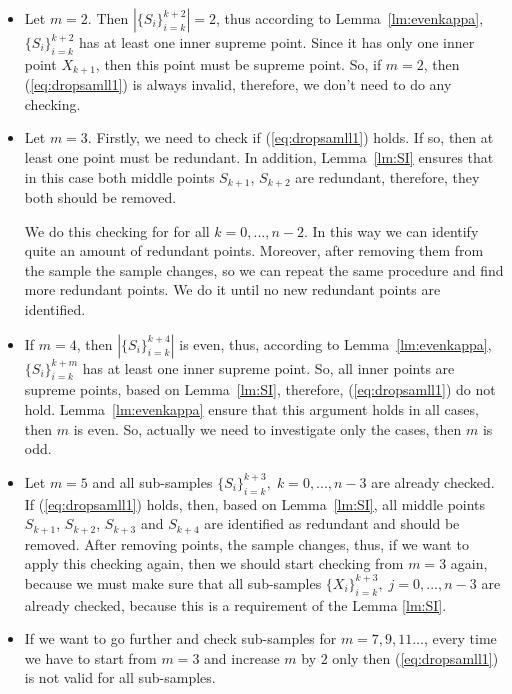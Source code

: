 \documentclass[12pt, a4paper]{article}
\numberwithin{equation}{section}
\begin{document}
\begin{itemize}

\item 
Let $m=2$. Then $|\{S_{i}\}_{i=k}^{k+2}|=2$, 
thus according to
Lemma~\ref{lm:evenkappa}, 
$\{S_{i}\}_{i=k}^{k+2}$ has at least one
inner supreme point. 
Since it has only one inner point $X_{k+1}$, then 
this point must be supreme point. 
So, if $m=2$, then  (\ref{eq:dropsamll1}) is always
invalid, therefore, we don't need to do any checking.

\item 
Let $m=3$. Firstly, we need to check if (\ref{eq:dropsamll1}) holds.
If so,
then at least one 
point must be redundant.
In addition, Lemma~\ref{lm:SI} ensures that in this case
both middle points $S_{k+1}$, $S_{k+2}$ 
are redundant, therefore, they both should be removed. 

We do this checking for  for all
$k=0,...,n-2$. In this way
we can identify quite an amount of redundant
points. Moreover, 
after removing them from the sample the 
sample changes, so we can repeat the same procedure
and find more redundant points. We do it until
no new redundant points are 
identified.

\item 
If $m=4$, then $|\{S_{i}\}_{i=k}^{k+4}|$ is even, 
thus, according to Lemma~\ref{lm:evenkappa}, 
$\{S_{i}\}_{i=k}^{k+m}$ has at least one
inner supreme point. 
So, all inner points are supreme points, 
based on Lemma~\ref{lm:SI}, therefore, 
(\ref{eq:dropsamll1}) do not hold.
Lemma~\ref{lm:evenkappa} ensure
that this argument holds in all cases, then $m$ is even.
So, actually we need to investigate only the cases, then 
$m$ is odd. 

\item 
Let 
$m=5$ and all sub-samples
 $\{S_{i}\}_{i=k}^{k+3},\;k=0,...,n-3$ are already 
 checked.
If (\ref{eq:dropsamll1}) holds, then, based on
Lemma~\ref{lm:SI}, all middle points
$S_{k+1}$, $S_{k+2}$, $S_{k+3}$  and $S_{k+4}$ are  
identified as redundant and should be removed.
After removing points, the sample changes, thus,
if we want to apply this checking again,
then we should start checking from $m=3$ again, because
we must make sure that all sub-samples
$\{X_{i}\}_{i=k}^{k+3},\;j=0,...,n-3$ are already 
checked, because this is a requirement of the Lemma \ref{lm:SI}.

\item If we want to go further and check
sub-samples for $m=7,9,11\dots$, every time we have to
start from $m=3$ and increase $m$ by $2$ only then
(\ref{eq:dropsamll1}) is not valid for
all sub-samples.

\end{itemize}
\end{document}
